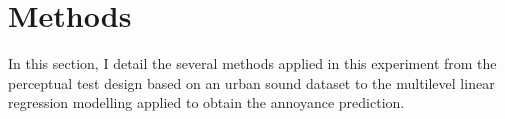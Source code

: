 





\section{Methods}

In this section, I detail the several methods applied in this experiment from the perceptual test design based on an urban sound dataset  to the multilevel linear regression modelling applied to obtain the annoyance prediction.

